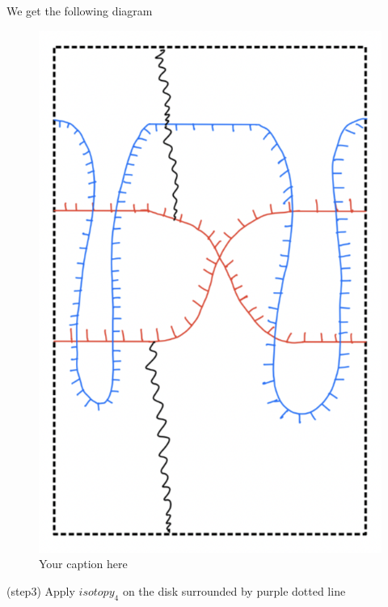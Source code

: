 We get the following diagram
\begin{figure}[H] %
    \centering
    \includegraphics[scale = 0.95]{diagrams/lemma10/6.png} %
    \caption{Your caption here}
    \label{fig:your-label}
\end{figure}

(step3) Apply $isotopy_4$ on the disk surrounded by purple dotted line


